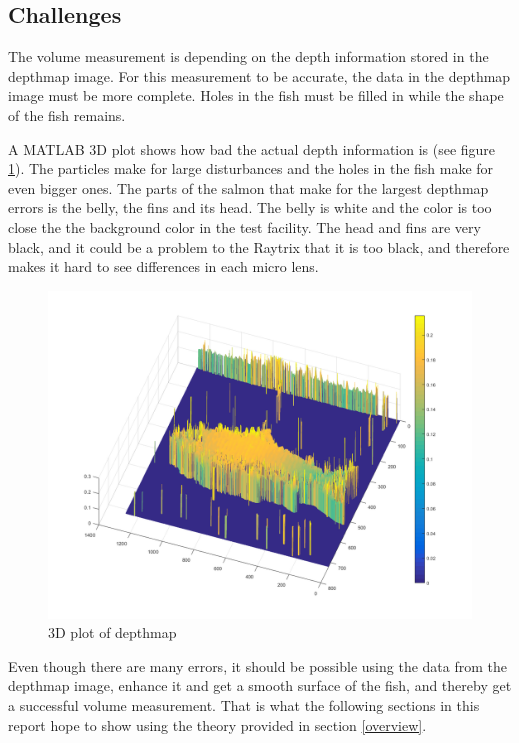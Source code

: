 \subsection{Challenges}

The volume measurement is depending on the depth information stored in the depthmap image. For this measurement to be accurate, the data in the depthmap image must be more complete. Holes in the fish must be filled in while the shape of the fish remains.

A MATLAB 3D plot shows how bad the actual depth information is (see figure \ref{fig:matlab3D}). The particles make for large disturbances and the holes in the fish make for even bigger ones. The parts of the salmon that make for the largest depthmap errors is the belly, the fins and its head. The belly is white and the color is too close the the background color in the test facility. The head and fins are very black, and it could be a problem to the Raytrix that it is too black, and therefore makes it hard to see differences in each micro lens.

\begin{figure}[H]
    \centering
    \includegraphics[width=.7\linewidth]{images/aim_of_study/original_3D_82}
    \caption{3D plot of depthmap}
    \label{fig:matlab3D}
\end{figure}

Even though there are many errors, it should be possible using the data from the depthmap image, enhance it and get a smooth surface of the fish, and thereby get a successful volume measurement. That is what the following sections in this report hope to show using the theory provided in section \ref{overview}.
